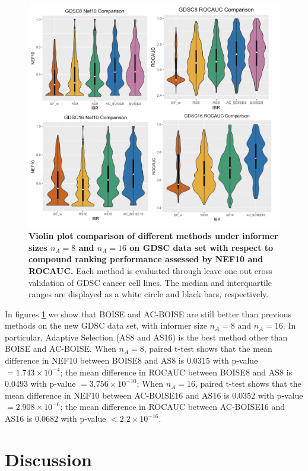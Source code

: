 \documentclass[12pt]{article}
\begin{document}
\begin{figure}[!ht]
\centering
\includegraphics[width=5.0in]{GDSC.png}
\caption{\label{fig:gdsc} 
{\bf Violin plot comparison of different methods under informer sizes $n_A =8$ and $n_A = 16$ on GDSC data set with respect to compound ranking performance assessed by NEF10 and ROCAUC.} Each method is evaluated through leave one out cross validation of GDSC cancer cell lines. The median and interquartile ranges are displayed as a white circle and black bars, respectively.}
\end{figure}

In figures \ref{fig:gdsc} we show that BOISE and AC-BOISE are still better than previous methods on the new GDSC data set, with informer size $n_A = 8$ and $n_A = 16$. In particular, Adaptive Selection (AS8 and AS16) is the best method other than BOISE and AC-BOISE. When $n_A = 8$, paired t-test shows that the mean difference in NEF10 between BOISE8 and AS8 is $0.0315$ with p-value $= 1.743\times 10^{-4}$; the mean difference in ROCAUC between BOISE8 and AS8 is $0.0493$ with p-value $= 3.756\times 10^{-10}$; When $n_A = 16$, paired t-test shows that the mean difference in NEF10 between AC-BOISE16 and AS16 is $0.0352$ with p-value $= 2.908\times 10^{-6}$; the mean difference in ROCAUC between AC-BOISE16 and AS16 is $0.0682$ with p-value $<2.2\times 10^{-16}$. 


\section{Discussion}
\end{document}
